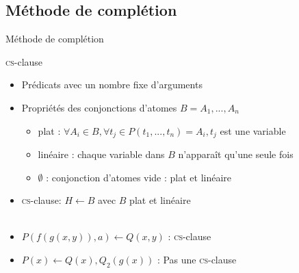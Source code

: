 \documentclass[xcolor={dvipsnames}]{beamer}
\newcommand{\csclause}{\textsc{cs}-clause\xspace}
\begin{document}
\subsection{Méthode de complétion}

\begin{frame}{Méthode de complétion}
  \begin{center}
  \end{center}
\end{frame}

\begin{frame}{\csclause}
  \begin{itemize}[<+->]
  \item Prédicats avec un nombre fixe d'arguments
  \item Propriétés des conjonctions d'atomes $B = A_1, ..., A_n$
    \begin{itemize}
    \item plat : $\forall A_i \in B, \forall t_j \in P(t_1, ..., t_n) = A_i, t_j$ est une variable
    \item linéaire : chaque variable dans $B$ n'apparaît qu'une seule fois
    \item $\emptyset$ : conjonction d'atomes vide : plat et linéaire
    \end{itemize}
    \vspace{\baselineskip}
  \item \csclause : $H \leftarrow B$ avec $B$ plat et linéaire \\~

  \item $P(f(g(x,y)),a) \leftarrow Q(x,y)$ : \csclause
  \item $P(x) \leftarrow Q(x),Q_2(g(x))$ : Pas une \csclause
  \end{itemize}
  
\end{frame}
\end{document}
